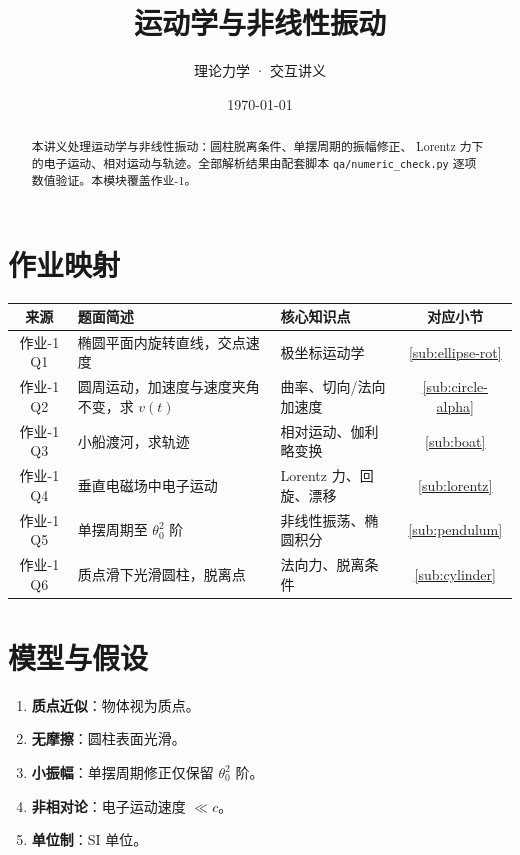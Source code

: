 \documentclass[UTF8,a4paper,11pt]{ctexart}
\title{\textbf{运动学与非线性振动}}
\author{理论力学 · 交互讲义}
\date{\today}
\begin{document}
\maketitle

\begin{abstract}
本讲义处理运动学与非线性振动：圆柱脱离条件、单摆周期的振幅修正、
Lorentz 力下的电子运动、相对运动与轨迹。全部解析结果由配套脚本
\texttt{qa/numeric\_check.py} 逐项数值验证。本模块覆盖作业-1。
\end{abstract}

\tableofcontents
\newpage

\section{作业映射}
\label{sec:map}

\begin{center}
\small
\begin{tabular}{cp{6.5cm}p{3.5cm}c}
\toprule
来源 & 题面简述 & 核心知识点 & 对应小节 \\
\midrule
作业-1 Q1 & 椭圆平面内旋转直线，交点速度 &
  极坐标运动学 & \ref{sub:ellipse-rot} \\
作业-1 Q2 & 圆周运动，加速度与速度夹角不变，求 $v(t)$ &
  曲率、切向/法向加速度 & \ref{sub:circle-alpha} \\
作业-1 Q3 & 小船渡河，求轨迹 &
  相对运动、伽利略变换 & \ref{sub:boat} \\
作业-1 Q4 & 垂直电磁场中电子运动 &
  Lorentz 力、回旋、漂移 & \ref{sub:lorentz} \\
作业-1 Q5 & 单摆周期至 $\theta_0^2$ 阶 &
  非线性振荡、椭圆积分 & \ref{sub:pendulum} \\
作业-1 Q6 & 质点滑下光滑圆柱，脱离点 &
  法向力、脱离条件 & \ref{sub:cylinder} \\
\bottomrule
\end{tabular}
\end{center}

\section{模型与假设}
\label{sec:model}

\begin{enumerate}
  \item \textbf{质点近似}：物体视为质点。
  \item \textbf{无摩擦}：圆柱表面光滑。
  \item \textbf{小振幅}：单摆周期修正仅保留 $\theta_0^2$ 阶。
  \item \textbf{非相对论}：电子运动速度 $\ll c$。
  \item \textbf{单位制}：SI 单位。
\end{enumerate}
\end{document}

